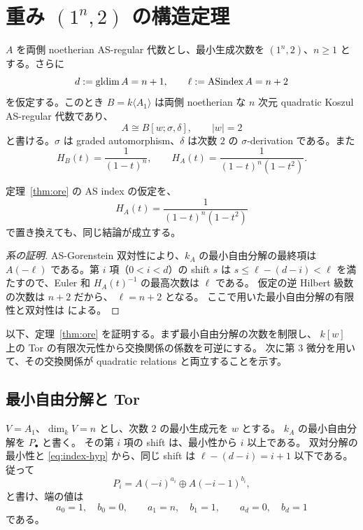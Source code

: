 \section{重み \texorpdfstring{\((1^n,2)\)}{(1,...,1,2)} の構造定理}\label{sec:general}

\begin{theorem}\label{thm:ore}
\(A\) を両側 noetherian AS-regular 代数とし、最小生成次数を
\((1^n,2)\)、\(n\ge1\) とする。さらに
\begin{equation}\label{eq:index-hyp}
d:=\operatorname{gldim} A=n+1,\qquad \ell:=\operatorname{ASindex} A=n+2
\end{equation}
を仮定する。このとき \(B=k\langle A_1\rangle\) は両側 noetherian な
\(n\) 次元 quadratic Koszul AS-regular 代数であり、
\[
A\cong B[w;\sigma,\delta],\qquad |w|=2
\]
と書ける。\(\sigma\) は graded automorphism、\(\delta\) は次数 \(2\) の
\(\sigma\)-derivation である。また
\begin{equation}\label{eq:standard-hilbert}
H_B(t)=\frac1{(1-t)^n},\qquad
H_A(t)=\frac1{(1-t)^n(1-t^2)}.
\end{equation}
\end{theorem}

\begin{corollary}\label{cor:hilbert-hyp}
定理~\ref{thm:ore} の AS index の仮定を、
\[
H_A(t)=\frac1{(1-t)^n(1-t^2)}
\]
で置き換えても、同じ結論が成立する。
\end{corollary}

\begin{proof}[系の証明]
AS-Gorenstein 双対性により、\(k_A\) の最小自由分解の最終項は
\(A(-\ell)\) である。第 \(i\) 項（\(0<i<d\)）の shift \(s\) は
\(s\le\ell-(d-i)<\ell\) を満たすので、Euler 和
\(H_A(t)^{-1}\) の最高次数は \(\ell\) である。
仮定の逆 Hilbert 級数の次数は \(n+2\) だから、
\(\ell=n+2\) となる。
ここで用いた最小自由分解の有限性と双対性は
\cite[Lemma~1.1]{LPWZ} による。
\end{proof}

以下、定理~\ref{thm:ore} を証明する。まず最小自由分解の次数を制限し、
\(k[w]\) 上の Tor の有限次元性から交換関係の係数を可逆にする。
次に第 3 微分を用いて、その交換関係が quadratic relations と両立することを示す。

\subsection{最小自由分解と Tor}

\(V=A_1\)、\(\dim_kV=n\) とし、次数 \(2\) の最小生成元を \(w\) とする。
\(k_A\) の最小自由分解を \(P_\bullet\) と書く。
その第 \(i\) 項の shift は、最小性から \(i\) 以上である。
双対分解の最小性と \eqref{eq:index-hyp} から、同じ shift は
\(\ell-(d-i)=i+1\) 以下である。
従って
\begin{equation}\label{eq:two-strands}
P_i=A(-i)^{a_i}\oplus A(-i-1)^{b_i},
\end{equation}
と書け、端の値は
\[
a_0=1,\quad b_0=0,\qquad
a_1=n,\quad b_1=1,\qquad
a_d=0,\quad b_d=1
\]
である。

